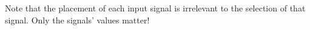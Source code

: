 Note that the placement of each input signal is irrelevant to the selection of that signal.  Only the signals' values matter!











